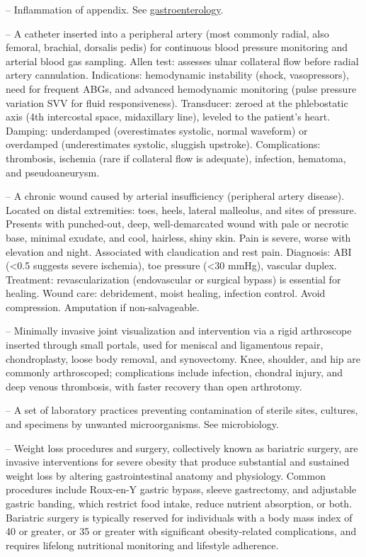 -- Inflammation of appendix. See \hyperlink{Gastroenterology}{gastroenterology}.

-- A catheter inserted into a peripheral artery (most commonly radial, also femoral, brachial, dorsalis pedis) for continuous blood pressure monitoring and arterial blood gas sampling. Allen test: assesses ulnar collateral flow before radial artery cannulation. Indications: hemodynamic instability (shock, vasopressors), need for frequent ABGs, and advanced hemodynamic monitoring (pulse pressure variation SVV for fluid responsiveness). Transducer: zeroed at the phlebostatic axis (4th intercostal space, midaxillary line), leveled to the patient's heart. Damping: underdamped (overestimates systolic, normal waveform) or overdamped (underestimates systolic, sluggish upstroke). Complications: thrombosis, ischemia (rare if collateral flow is adequate), infection, hematoma, and pseudoaneurysm.

-- A chronic wound caused by arterial insufficiency (peripheral artery disease). Located on distal extremities: toes, heels, lateral malleolus, and sites of pressure. Presents with punched-out, deep, well-demarcated wound with pale or necrotic base, minimal exudate, and cool, hairless, shiny skin. Pain is severe, worse with elevation and night. Associated with claudication and rest pain. Diagnosis: ABI (<0.5 suggests severe ischemia), toe pressure (<30 mmHg), vascular duplex. Treatment: revascularization (endovascular or surgical bypass) is essential for healing. Wound care: debridement, moist healing, infection control. Avoid compression. Amputation if non-salvageable.

-- Minimally invasive joint visualization and intervention via a rigid arthroscope inserted through small portals, used for meniscal and ligamentous repair, chondroplasty, loose body removal, and synovectomy. Knee, shoulder, and hip are commonly arthroscoped; complications include infection, chondral injury, and deep venous thrombosis, with faster recovery than open arthrotomy.

-- A set of laboratory practices preventing contamination of sterile sites, cultures, and specimens by unwanted microorganisms. See microbiology.

-- Weight loss procedures and surgery, collectively known as bariatric surgery, are invasive interventions for severe obesity that produce substantial and sustained weight loss by altering gastrointestinal anatomy and physiology. Common procedures include Roux-en-Y gastric bypass, sleeve gastrectomy, and adjustable gastric banding, which restrict food intake, reduce nutrient absorption, or both. Bariatric surgery is typically reserved for individuals with a body mass index of 40 or greater, or 35 or greater with significant obesity-related complications, and requires lifelong nutritional monitoring and lifestyle adherence.

